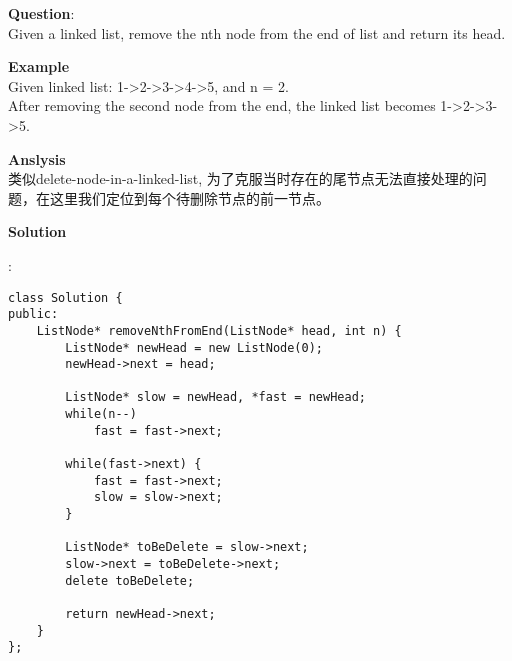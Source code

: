     
\begin{description}
    \item{\textbf{Question}}:\\%
		Given a linked list, remove the nth node from the end of list and return its head.

    \item{\textbf{Example}}\\
		Given linked list: 1->2->3->4->5, and n = 2.\\
		After removing the second node from the end, the linked list becomes 1->2->3->5.

    \item{\textbf{Anslysis}}\\
		类似delete-node-in-a-linked-list, 为了克服当时存在的尾节点无法直接处理的问题，在这里我们定位到每个待删除节点的前一节点。

    \item{\textbf{Solution}}
	\item{} : \\
		\begin{lstlisting}
class Solution {
public:
    ListNode* removeNthFromEnd(ListNode* head, int n) {
		ListNode* newHead = new ListNode(0);
		newHead->next = head;

		ListNode* slow = newHead, *fast = newHead;
		while(n--)
			fast = fast->next;

		while(fast->next) {
			fast = fast->next;
			slow = slow->next;
		}

		ListNode* toBeDelete = slow->next;
		slow->next = toBeDelete->next;
		delete toBeDelete;

		return newHead->next;
	}
};
		\end{lstlisting}
\end{description}

